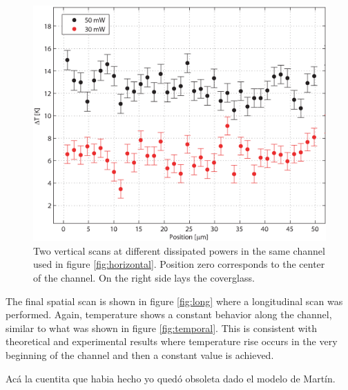 \documentclass[twocolumn]{svjour3}       %
\begin{document}
\begin{figure}[h!]
\centering
\includegraphics[width=\columnwidth]{figs/vertical.eps}
\caption{Two vertical scans at different dissipated powers in the same channel used in figure \ref{fig:horizontal}. Position zero corresponds to the center of the channel. On the right side lays the coverglass.\label{fig:vertical}}
\end{figure}

The final spatial scan is shown in figure \ref{fig:long} where a longitudinal scan was performed. Again, temperature shows a constant behavior along the channel, similar to what was shown in figure \ref{fig:temporal}. This is consistent with theoretical and experimental results \cite{jouleteorico,xuan2008} where temperature rise occurs in the very beginning of the channel and then a constant value is achieved. 

Acá la cuentita que habia hecho yo quedó obsoleta dado el modelo de Martín. 
%
\end{document}
